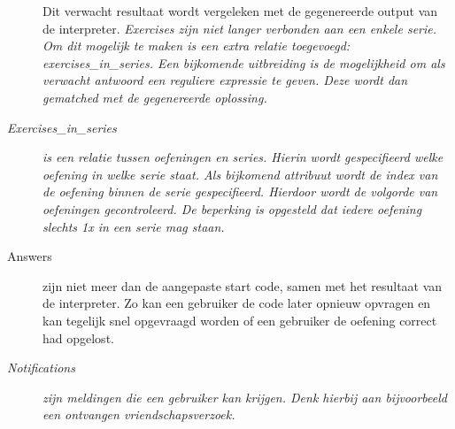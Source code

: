 \begin{description}
        Dit verwacht resultaat wordt vergeleken met de gegenereerde output van de interpreter. \textsl{Exercises
        zijn niet langer verbonden aan een enkele serie. Om dit mogelijk te maken is een extra relatie toegevoegd:
        exercises\_in\_series. Een bijkomende uitbreiding is de mogelijkheid om als verwacht antwoord een reguliere
        expressie te geven. Deze wordt dan gematched met de gegenereerde oplossing.}
    \item[\textsl{Exercises\_in\_series}] \textsl{is een relatie tussen oefeningen en series. Hierin wordt gespecifieerd welke oefening
        in welke serie staat. Als bijkomend attribuut wordt de index van de oefening binnen de serie gespecifieerd.
        Hierdoor wordt de volgorde van oefeningen gecontroleerd. De beperking is opgesteld dat iedere oefening slechts 1x
        in een serie mag staan.}
    \item[Answers] zijn niet meer dan de aangepaste start code, samen met het resultaat
        van de interpreter. Zo kan een gebruiker de code later opnieuw opvragen en kan tegelijk snel
        opgevraagd worden of een gebruiker de oefening correct had opgelost.
    \item[\textsl{Notifications}] \textsl{zijn meldingen die een gebruiker kan krijgen. Denk hierbij aan bijvoorbeeld een
        ontvangen vriendschapsverzoek.}
\end{description}
